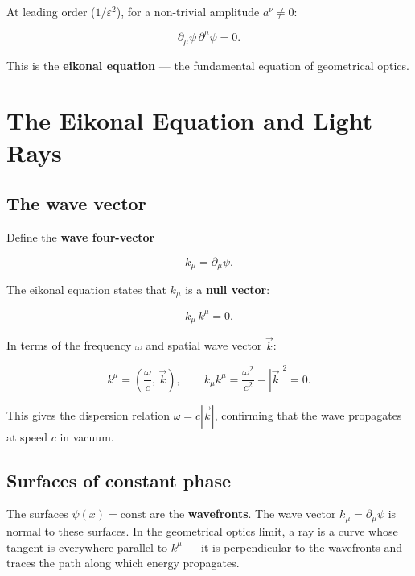 At leading order ($1/\varepsilon^2$), for a non-trivial amplitude $a^\nu \neq 0$:

\begin{equation}
\boxed{\partial_\mu\psi\,\partial^\mu\psi = 0.}
\end{equation}

This is the \textbf{eikonal equation} --- the fundamental equation of geometrical optics.

\section{The Eikonal Equation and Light Rays}

\subsection{The wave vector}

Define the \textbf{wave four-vector}

\begin{equation}
k_\mu = \partial_\mu\psi.
\end{equation}

The eikonal equation states that $k_\mu$ is a \textbf{null vector}:

\begin{equation}
k_\mu\,k^\mu = 0.
\end{equation}

In terms of the frequency $\omega$ and spatial wave vector $\vec{k}$:

\begin{equation}
k^\mu = \left(\frac{\omega}{c},\,\vec{k}\right), \qquad k_\mu k^\mu = \frac{\omega^2}{c^2} - |\vec{k}|^2 = 0.
\end{equation}

This gives the dispersion relation $\omega = c|\vec{k}|$, confirming that the wave propagates at speed $c$ in vacuum.

\subsection{Surfaces of constant phase}

The surfaces $\psi(x) = \text{const}$ are the \textbf{wavefronts}. The wave vector $k_\mu = \partial_\mu\psi$ is normal to these surfaces. In the geometrical optics limit, a ray is a curve whose tangent is everywhere parallel to $k^\mu$ --- it is perpendicular to the wavefronts and traces the path along which energy propagates.


